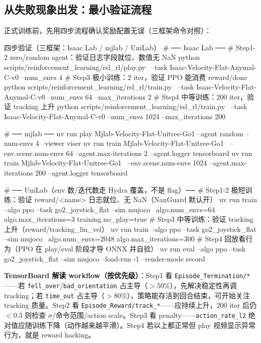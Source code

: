 \subsection{从失败现象出发：最小验证流程}
\label{sec:rlmc-rew-smoke}

正式训练前，先用四步流程确认奖励配置无误（三框架命令对照）：

\begin{codebox}[bash]{四步验证（三框架：Isaac Lab / mjlab / UniLab）}
# ── Isaac Lab ──
# Step1-2 zero/random agent：验证日志字段就位、数值无 NaN
python scripts/reinforcement_learning/rsl_rl/play.py \
  --task Isaac-Velocity-Flat-Anymal-C-v0 --num_envs 4
# Step3 极小训练：2 iter，验证 PPO 能消费 reward/done
python scripts/reinforcement_learning/rsl_rl/train.py \
  --task Isaac-Velocity-Flat-Anymal-C-v0 --num_envs 64 --max_iterations 2
# Step4 中等训练：200 iter，验证 tracking 上升
python scripts/reinforcement_learning/rsl_rl/train.py \
  --task Isaac-Velocity-Flat-Anymal-C-v0 --num_envs 1024 --max_iterations 200

# ── mjlab ──
uv run play Mjlab-Velocity-Flat-Unitree-Go1 --agent random --num-envs 4 --viewer viser
uv run train Mjlab-Velocity-Flat-Unitree-Go1 \
  --env.scene.num-envs 64 --agent.max-iterations 2 --agent.logger tensorboard
uv run train Mjlab-Velocity-Flat-Unitree-Go1 \
  --env.scene.num-envs 1024 --agent.max-iterations 200 --agent.logger tensorboard

# ── UniLab（env 数/迭代数走 Hydra 覆盖，不是 flag）──
# Step1-2 极短训练：验证 reward/<name> 日志就位、无 NaN（NanGuard 默认开）
uv run train --algo ppo --task go2_joystick_flat --sim mujoco \
  algo.num_envs=64 algo.max_iterations=3 training.no_play=true
# Step3 中等训练：验证 tracking 上升（reward/tracking_lin_vel）
uv run train --algo ppo --task go2_joystick_flat --sim mujoco \
  algo.num_envs=2048 algo.max_iterations=300
# Step4 回放看行为（PPO 在 play/eval 阶段才导 ONNX 并自验）
uv run eval --algo ppo --task go2_joystick_flat --sim mujoco --load-run -1 --render-mode record
\end{codebox}

\textbf{TensorBoard 解读 workflow（按优先级）}：Step1 看 \verb|Episode_Termination/*|——若 \verb|fell_over|/\verb|bad_orientation| 占主导（$>50\%$），先解决稳定性再调 tracking；若 \verb|time_out| 占主导（$>80\%$），策略能存活到回合结束，可开始关注 tracking 质量。Step2 看 \verb|Episode_Reward/track_*|——应持续上升，$200$ iter 后仍 $<0.3$ 则检查 $\sigma$/命令范围/action scale。Step3 看 penalty——\verb|action_rate_l2| 绝对值应随训练下降（动作越来越平滑）。Step4 若以上都正常但 play 视频显示异常行为，就是 reward hacking。


